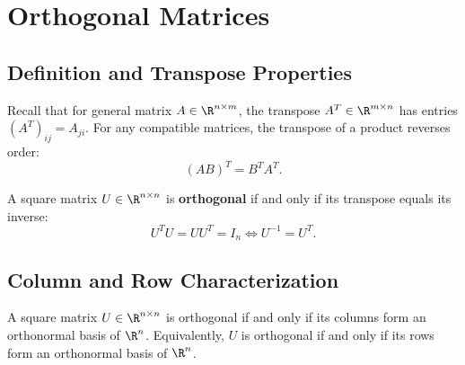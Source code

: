 \FloatBarrier
\section{Orthogonal Matrices}

\subsection{Definition and Transpose Properties}

Recall that for general matrix $A \in \R^{n \times m}$, the transpose $A^T \in \R^{m \times n}$ has entries $(A^T)_{ij} = A_{ji}$. For any compatible matrices, the transpose of a product reverses order:
\begin{equation}
    (AB)^T = B^T A^T.
\end{equation}

\begin{definition}
A square matrix $U \in \R^{n \times n}$ is \textbf{orthogonal} if and only if its transpose equals its inverse:
\begin{equation}
    U^T U = U U^T = I_n \iff U^{-1} = U^T.
\end{equation}
\end{definition}

\subsection{Column and Row Characterization}

\begin{theorem}
A square matrix $U \in \R^{n \times n}$ is orthogonal if and only if its columns form an orthonormal basis of $\R^n$. Equivalently, $U$ is orthogonal if and only if its rows form an orthonormal basis of $\R^n$.
\end{theorem}

